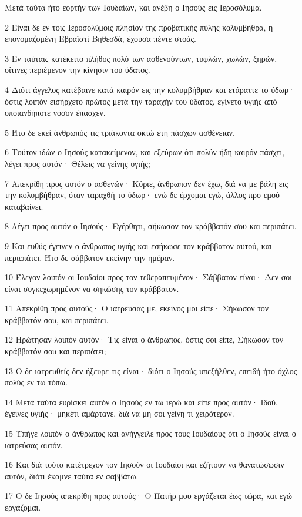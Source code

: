 \par Μετά ταύτα ήτο εορτήν των Ιουδαίων, και ανέβη ο Ιησούς εις Ιεροσόλυμα.
\par 2 Είναι δε εν τοις Ιεροσολύμοις πλησίον της προβατικής πύλης κολυμβήθρα, η επονομαζομένη Εβραϊστί Βηθεσδά, έχουσα πέντε στοάς.
\par 3 Εν ταύταις κατέκειτο πλήθος πολύ των ασθενούντων, τυφλών, χωλών, ξηρών, οίτινες περιέμενον την κίνησιν του ύδατος.
\par 4 Διότι άγγελος κατέβαινε κατά καιρόν εις την κολυμβήθραν και ετάραττε το ύδωρ· όστις λοιπόν εισήρχετο πρώτος μετά την ταραχήν του ύδατος, εγίνετο υγιής από οποιανδήποτε νόσον έπασχεν.
\par 5 Ήτο δε εκεί άνθρωπός τις τριάκοντα οκτώ έτη πάσχων ασθένειαν.
\par 6 Τούτον ιδών ο Ιησούς κατακείμενον, και εξεύρων ότι πολύν ήδη καιρόν πάσχει, λέγει προς αυτόν· Θέλεις να γείνης υγιής;
\par 7 Απεκρίθη προς αυτόν ο ασθενών· Κύριε, άνθρωπον δεν έχω, διά να με βάλη εις την κολυμβήθραν, όταν ταραχθή το ύδωρ· ενώ δε έρχομαι εγώ, άλλος προ εμού καταβαίνει.
\par 8 Λέγει προς αυτόν ο Ιησούς· Εγέρθητι, σήκωσον τον κράββατόν σου και περιπάτει.
\par 9 Και ευθύς έγεινεν ο άνθρωπος υγιής και εσήκωσε τον κράββατον αυτού, και περιεπάτει. Ήτο δε σάββατον εκείνην την ημέραν.
\par 10 Έλεγον λοιπόν οι Ιουδαίοι προς τον τεθεραπευμένον· Σάββατον είναι· Δεν σοι είναι συγκεχωρημένον να σηκώσης τον κράββατον.
\par 11 Απεκρίθη προς αυτούς· Ο ιατρεύσας με, εκείνος μοι είπε· Σήκωσον τον κράββατόν σου, και περιπάτει.
\par 12 Ηρώτησαν λοιπόν αυτόν· Τις είναι ο άνθρωπος, όστις σοι είπε, Σήκωσον τον κράββατόν σου και περιπάτει;
\par 13 Ο δε ιατρευθείς δεν ήξευρε τις είναι· διότι ο Ιησούς υπεξήλθεν, επειδή ήτο όχλος πολύς εν τω τόπω.
\par 14 Μετά ταύτα ευρίσκει αυτόν ο Ιησούς εν τω ιερώ και είπε προς αυτόν· Ιδού, έγεινες υγιής· μηκέτι αμάρτανε, διά να μη σοι γείνη τι χειρότερον.
\par 15 Υπήγε λοιπόν ο άνθρωπος και ανήγγειλε προς τους Ιουδαίους ότι ο Ιησούς είναι ο ιατρεύσας αυτόν.
\par 16 Και διά τούτο κατέτρεχον τον Ιησούν οι Ιουδαίοι και εζήτουν να θανατώσωσιν αυτόν, διότι έκαμνε ταύτα εν σαββάτω.
\par 17 Ο δε Ιησούς απεκρίθη προς αυτούς· Ο Πατήρ μου εργάζεται έως τώρα, και εγώ εργάζομαι.
